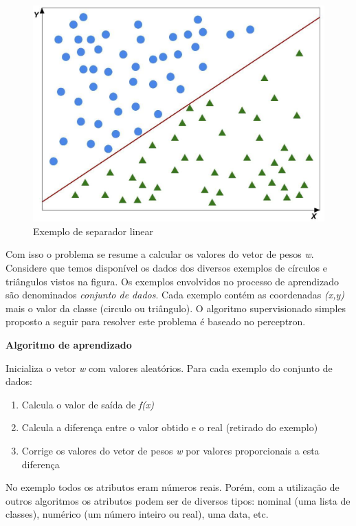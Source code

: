 \begin{figure}[h!]
  \includegraphics[width=\linewidth]{images/conceitosbasicos02.eps}
  \caption{Exemplo de separador linear}
  \label{fig:conceitosbasicos02}
\end{figure}

Com isso o problema se resume a calcular os valores do vetor de pesos \textit{w}.
Considere que temos disponível os dados dos diversos exemplos de círculos e triângulos vistos na figura.
Os exemplos envolvidos no processo de aprendizado são denominados \textit{conjunto de dados}.
Cada exemplo contém as coordenadas \textit{(x,y)} mais o valor da classe (circulo ou triângulo).
O algoritmo supervisionado simples proposto a seguir para resolver este problema é baseado no perceptron.
\\

\hline
\begin{center}
\textbf{Algoritmo de aprendizado}
\end{center}
\hline
\hfill \break
Inicializa o vetor \textit{w} com valores aleatórios.
Para cada exemplo do conjunto de dados:
\begin{enumerate}
\item Calcula o valor de saída de \textit{f(x)}
\item Calcula a diferença entre o valor obtido e o real (retirado do exemplo) 
\item Corrige os valores do vetor de pesos \textit{w} por valores proporcionais a esta diferença
\end{enumerate}
\hline
\hfill \break

No exemplo todos os atributos eram números reais.
Porém, com a utilização de outros algoritmos os atributos podem ser de diversos tipos: nominal (uma lista de classes), numérico (um número inteiro ou real), uma data, etc.

